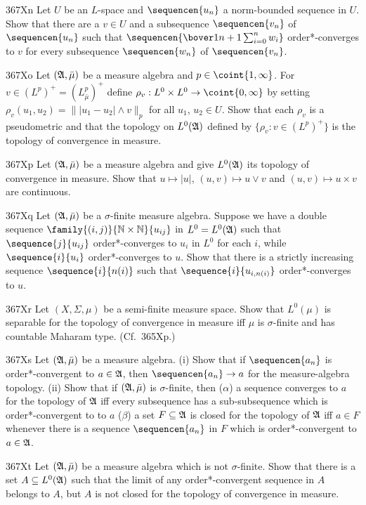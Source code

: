 {\spheader 367Xn Let $U$ be an $L$-space and $\sequencen{u_n}$ a
norm-bounded sequence in $U$.   Show that there are a $v\in U$ and a
subsequence $\sequencen{v_n}$ of $\sequencen{u_n}$ such that
$\sequencen{\bover1{n+1}\sum_{i=0}^nw_i}$ order*-converges to $v$ for
every subsequence $\sequencen{w_n}$ of $\sequencen{v_n}$.   
     
\spheader 367Xo Let $(\frak A,\bar\mu)$ be a measure algebra and
$p\in\coint{1,\infty}$.   For $v\in (L^p)^+=(L^p_{\bar\mu})^+$
define $\rho_v:L^0\times L^0\to\coint{0,\infty}$ by setting
$\rho_v(u_1,u_2)=\||u_1-u_2|\wedge v\|_p$ for all $u_1$, $u_2\in U$.
Show that each $\rho_v$ is a pseudometric and that the topology on
$L^0(\frak A)$ defined by $\{\rho_v:v\in(L^p)^+\}$ is the topology
of convergence in measure.
     
\sqheader 367Xp Let $(\frak A,\bar\mu)$ be a measure algebra and give
$L^0(\frak A)$ its topology of convergence in measure.   Show that
$u\mapsto |u|$, $(u,v)\mapsto u\vee v$ and $(u,v)\mapsto u\times v$ are
continuous.
     
\spheader 367Xq Let $(\frak A,\bar\mu)$ be a $\sigma$-finite measure
algebra.   Suppose we have a double sequence
$\family{(i,j)}{\Bbb N\times\Bbb N}{u_{ij}}$ in $L^0=L^0(\frak A)$ such that $\sequence{j}{u_{ij}}$ order*-converges to $u_i$ in $L^0$ for each
$i$, while $\sequence{i}{u_i}$ order*-converges to $u$.   Show that
there is a strictly
increasing sequence $\sequence{i}{n(i)}$ such that
$\sequence{i}{u_{i,n(i)}}$ order*-converges to $u$.
     
\spheader 367Xr Let $(X,\Sigma,\mu)$ be a semi-finite measure space.
Show that $L^0(\mu)$ is separable for the topology of convergence in
measure iff $\mu$ is $\sigma$-finite and has countable Maharam type.
(Cf.\ 365Xp.)
     
\spheader 367Xs Let $(\frak A,\bar\mu)$ be a measure algebra.   (i) Show
that if $\sequencen{a_n}$ is order*-convergent to $a\in\frak A$, then
$\sequencen{a_n}\to a$ for the measure-algebra topology.
(ii) Show that if $(\frak A,\bar\mu)$ is $\sigma$-finite, then
($\alpha$) a sequence converges to $a$ for the topology of $\frak A$ iff
every subsequence has a sub-subsequence which is order*-convergent to
to $a$ ($\beta$) a set $F\subseteq\frak A$ is closed for the topology of
$\frak A$ iff $a\in F$ whenever there is a sequence $\sequencen{a_n}$ in
$F$ which is order*-convergent to $a\in\frak A$.
     
\spheader 367Xt Let $(\frak A,\bar\mu)$ be a measure algebra which is
not $\sigma$-finite.   Show that there is a set
$A\subseteq L^0(\frak A)$ such that the limit of any order*-convergent sequence in $A$
belongs to $A$, but $A$ is not closed for the topology of convergence in
measure.
     
}
